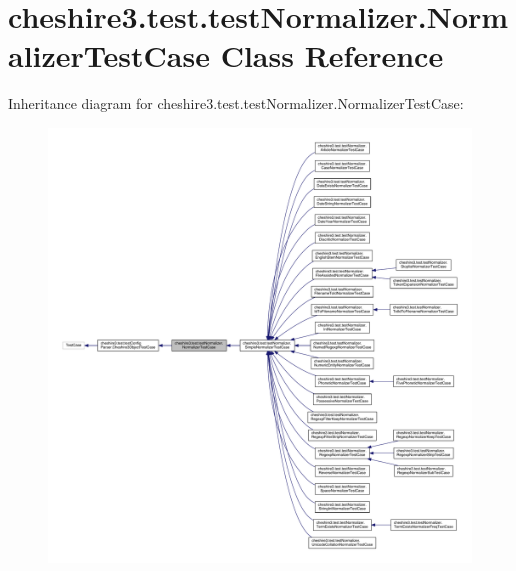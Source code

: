 \hypertarget{classcheshire3_1_1test_1_1test_normalizer_1_1_normalizer_test_case}{\section{cheshire3.\-test.\-test\-Normalizer.\-Normalizer\-Test\-Case Class Reference}
\label{classcheshire3_1_1test_1_1test_normalizer_1_1_normalizer_test_case}
}


Inheritance diagram for cheshire3.\-test.\-test\-Normalizer.\-Normalizer\-Test\-Case\-:
\nopagebreak
\begin{figure}[H]
\begin{center}
\leavevmode
\includegraphics[width=350pt]{classcheshire3_1_1test_1_1test_normalizer_1_1_normalizer_test_case__inherit__graph}
\end{center}
\end{figure}


